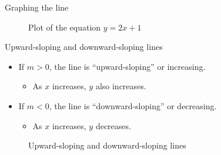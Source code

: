 \documentclass[
  10pt,
  ignorenonframetext,
]{beamer}
\providecommand{\tightlist}{%
  \setlength{\itemsep}{0pt}\setlength{\parskip}{0pt}}\usepackage{longtable,booktabs,array}
\begin{document}
\begin{frame}{Graphing the line}
\label{graphing-the-line}
\begin{figure}
\centering
{}
\caption{Plot of the equation \( y = 2x + 1 \)}
\end{figure}
\end{frame}

\begin{frame}{Upward-sloping and downward-sloping lines}
\label{upward-sloping-and-downward-sloping-lines}
\begin{itemize}
\tightlist
\item
  If \(m > 0\), the line is ``upward-sloping'' or increasing.

  \begin{itemize}
  \tightlist
  \item
    As \(x\) increases, \(y\) also increases.
  \end{itemize}
\item
  If \(m < 0\), the line is ``downward-sloping'' or decreasing.

  \begin{itemize}
  \tightlist
  \item
    As \(x\) increases, \(y\) decreases.
  \end{itemize}
\end{itemize}

\begin{figure}
\centering
{}
\caption{Upward-sloping and downward-sloping lines}
\end{figure}
\end{frame}
\end{document}
